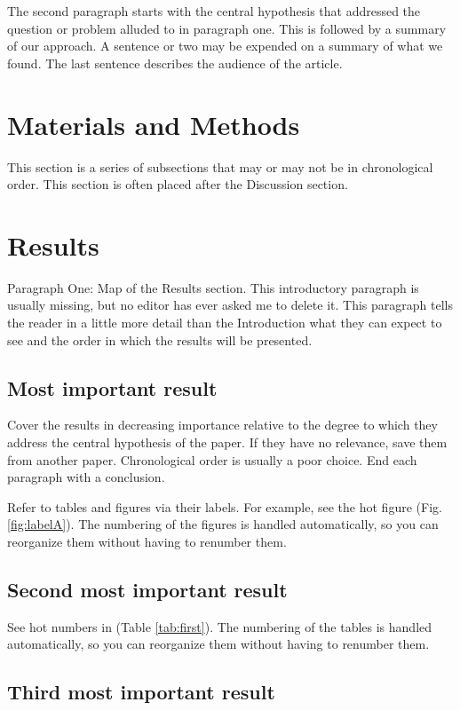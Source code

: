 \documentclass[11pt,letterpaper]{article}
\begin{document}
The second paragraph starts with the central hypothesis that addressed the question or problem alluded to in paragraph one.
This is followed by a summary of our approach.
A sentence or two may be expended on a summary of what we found.
The last sentence describes the audience of the article.



\section*{Materials and Methods}

This section is a series of subsections that may or may not be in chronological order.
This section is often placed after the Discussion section.

\section*{Results}

Paragraph One: Map of the Results section. 
This introductory paragraph is usually missing, but no editor has ever asked me to delete it.
This paragraph tells the reader in a little more detail than the Introduction what they can expect to see and the order in which the results will be presented.


\subsection*{Most important result}
Cover the results in decreasing importance relative to the degree to which they address the central hypothesis of the paper. 
If they have no relevance, save them from another paper.
Chronological order is usually a poor choice.
End each paragraph with a conclusion.

Refer to tables and figures via their labels.
For example, see the hot figure (Fig. \ref{fig:labelA}).
The numbering of the figures is handled automatically, so you can reorganize them without having to renumber them.

\subsection*{Second most important result}

See hot numbers in (Table \ref{tab:first}).
The numbering of the tables is handled automatically, so you can reorganize them without having to renumber them.


\subsection*{Third most important result}
\end{document}

